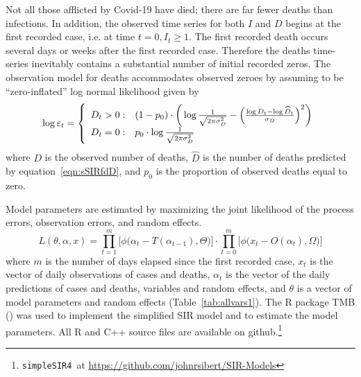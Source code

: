 \documentclass[12pt,letterpaper]{article}
\newcommand\SSm{{\tt simpleSIR4}}
\begin{document}
Not all those afflicted by Covid-19 have died; there are far fewer
deaths than infections. In addition,
the observed time series for both $I$ and $D$ begins at the first recorded
case, i.e. at time $t=0, I_t \ge 1$. The first recorded death occurs
several days or weeks after the first recorded case.
Therefore the deaths time-series inevitably contains a
substantial number of initial recorded zeros. 
The observation model for deaths accommodates observed zeroes by
assuming to be ``zero-inflated'' log normal likelihood given by
\begin{equation}
\label{eqn:ZIlogNlike}
  \log \varepsilon_t = \left\{
    \begin{array}{r@{\;:\quad}l}
       D_t > 0 &
(1-p_0)\cdot\bigg(\log\frac{1}{\sqrt{2\pi\sigma^2_D}}
          -\Bigl(\frac{\log D_t-\log\widehat{D}_t}{\sigma_D}\Bigr)^2\bigg)\\
       D_t = 0 & p_0 \cdot\log \frac{1}{\sqrt{2\pi\sigma^2_D}}\\
    \end{array}
  \right.
\end{equation}
where $D$ is the observed number of deaths,
$\widehat{D}$ is the number of deaths predicted by
equation~\ref{eqn:sSIRfdD}, 
and $p_0$ is the proportion of observed deaths equal to zero.

Model parameters are estimated by
maximizing the joint likelihood of the process errors, observation
errors, and random effects.
\begin{equation}
\label{eqn:likelihood}
L(\theta,\alpha,x)=
\prod^m_{t=1}\big[\phi\big(\alpha_t-T(\alpha_{t-1}), \Theta\big)\big]\cdot
\prod^m_{t=0}\big[\phi\big(x_t-O(\alpha_t), \Omega\big)\big]
\end{equation}
where $m$ is the number of days elapsed since the first recorded case,
$x_t$ is the vector of daily observations of cases and deaths,
$\alpha_t$ is the vector of the daily predictions of cases and deaths,
variables and random effects,
and $\theta$ 
is a vector of model parameters and random effects (Table~\ref{tab:allvars1}).
The R package TMB (\cite{TMB0000}) was used to implement the
simplified SIR model and to 
estimate the model parameters.
All R and C++ source files are available on 
github.\footnote{\SSm~at \url{https://github.com/johnrsibert/SIR-Models}}
\end{document}
